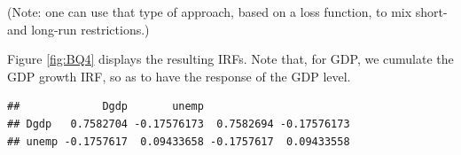 \documentclass[
  12pt,
]{book}
\newenvironment{Shaded}{\begin{snugshade}}{\end{snugshade}}
\newcommand{\DecValTok}[1]{\textcolor[rgb]{0.00,0.00,0.81}{#1}}
\newcommand{\FunctionTok}[1]{\textcolor[rgb]{0.00,0.00,0.00}{#1}}
\newcommand{\NormalTok}[1]{#1}
\newcommand{\OtherTok}[1]{\textcolor[rgb]{0.56,0.35,0.01}{#1}}
\newcommand{\SpecialCharTok}[1]{\textcolor[rgb]{0.00,0.00,0.00}{#1}}
\theoremstyle{definition}
\theoremstyle{definition}
\theoremstyle{definition}
\theoremstyle{definition}
\theoremstyle{remark}
\begin{document}
(Note: one can use that type of approach, based on a loss function, to mix short- and long-run restrictions.)

Figure \ref{fig:BQ4} displays the resulting IRFs. Note that, for GDP, we cumulate the GDP growth IRF, so as to have the response of the GDP level.

\begin{Shaded}
\end{Shaded}

\begin{verbatim}
##             Dgdp       unemp                       
## Dgdp   0.7582704 -0.17576173  0.7582694 -0.17576173
## unemp -0.1757617  0.09433658 -0.1757617  0.09433558
\end{verbatim}
\end{document}
